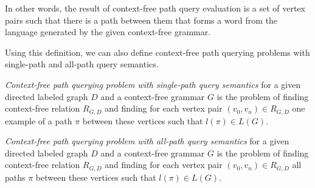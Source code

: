 In other words, the result of context-free path query evaluation is a set of vertex pairs such that there is a path between them that forms a word from the language generated by the given context-free grammar.

Using this definition, we can also define context-free path querying problems with single-path and all-path query semantics.

\begin{definition}
	\emph{Context-free path querying problem with single-path query semantics} for a given directed labeled graph $D$ and a context-free grammar $G$ is the problem of finding context-free relation $R_{G, D}$ and finding for each vertex pair $(v_0, v_n) \in R_{G, D}$ one example of a path $\pi$ between these vertices such that $l(\pi) \in L(G)$.
\end{definition}

\begin{definition}
	\emph{Context-free path querying problem with all-path query semantics} for a given directed labeled graph $D$ and a context-free grammar $G$ is the problem of finding context-free relation $R_{G, D}$ and finding for each vertex pair $(v_0, v_n) \in R_{G, D}$ all paths $\pi$ between these vertices such that $l(\pi) \in L(G)$.
\end{definition}
